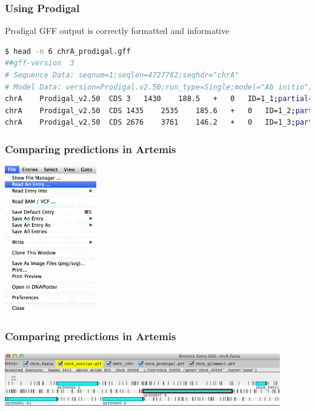\documentclass[table]{beamer}
\begin{document}
  \begin{frame}[fragile]
    \frametitle{Using Prodigal}
    Prodigal GFF output is correctly formatted and informative
    \begin{lstlisting}[language=bash]
$ head -n 6 chrA_prodigal.gff 
##gff-version  3
# Sequence Data: seqnum=1;seqlen=4727782;seqhdr="chrA"
# Model Data: version=Prodigal.v2.50;run_type=Single;model="Ab initio";gc_cont=54.48;transl_table=11;uses_sd=1
chrA	Prodigal_v2.50	CDS	3	1430	188.5	+	0	ID=1_1;partial=10;start_type=Edge;rbs_motif=None;rbs_spacer=None;score=188.54;cscore=185.37;sscore=3.18;rscore=0.00;uscore=3.18;tscore=0.00
chrA	Prodigal_v2.50	CDS	1435	2535	185.6	+	0	ID=1_2;partial=00;start_type=ATG;rbs_motif=None;rbs_spacer=None;score=185.61;cscore=184.24;sscore=1.36;rscore=-7.73;uscore=3.48;tscore=4.37
chrA	Prodigal_v2.50	CDS	2676	3761	146.2	+	0	ID=1_3;partial=00;start_type=ATG;rbs_motif=None;rbs_spacer=None;score=146.19;cscore=149.82;sscore=-3.63;rscore=-7.73;uscore=-0.28;tscore=4.37
    \end{lstlisting}
\end{frame}  

    \begin{frame}
     \frametitle{Comparing predictions in Artemis}
      \begin{center}
        \includegraphics[width=0.3\textwidth]{images/artemis_cdspred0}     
      \end{center}
    \end{frame}  

    \begin{frame}
     \frametitle{Comparing predictions in Artemis}
      \begin{center}
        \includegraphics[width=0.9\textwidth]{images/artemis_cdspred1}     
      \end{center}
    \end{frame}  
\end{document}
